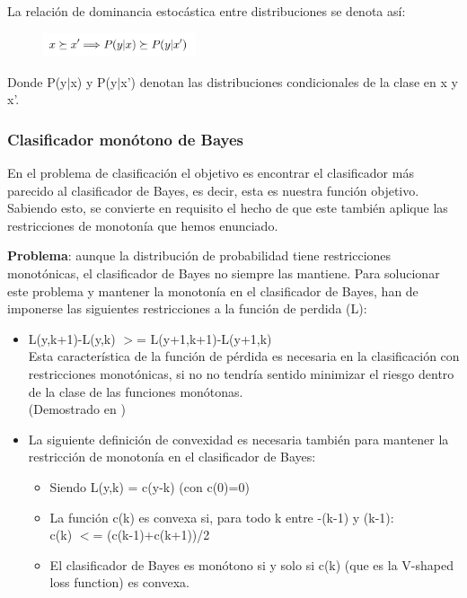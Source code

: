 La relación de dominancia estocástica entre distribuciones se denota así:

\begin{figure}[H]
	\centering
	\includegraphics[width=0.4\textwidth]{imagenes/f1}
\end{figure}

Donde P(y$|$x) y P(y$|$x') denotan las distribuciones condicionales de la clase en x y x'. 

\subsubsection{Clasificador monótono de Bayes}

En el problema de clasificación el objetivo es encontrar el clasificador más
parecido al clasificador de Bayes, es decir, esta es nuestra función objetivo.
Sabiendo esto, se convierte en requisito el hecho de que este también aplique
las restricciones de monotonía que hemos enunciado. 

\textbf{Problema}: aunque la
distribución de probabilidad tiene restricciones monotónicas, el clasificador
de Bayes no siempre las mantiene.
Para solucionar este problema y mantener la monotonía en el clasificador de 
Bayes, han de imponerse las siguientes restricciones a la función de perdida
(L):

\begin{itemize}
	\item L(y,k+1)-L(y,k) $>$= L(y+1,k+1)-L(y+1,k) \\
	Esta característica de la función de pérdida es necesaria
	en la clasificación con restricciones monotónicas, si no no
	tendría sentido minimizar el riesgo dentro de la clase de las funciones monótonas.\\
	(Demostrado en \cite{ref2})
	\item La siguiente definición de convexidad es necesaria también para
	mantener la restricción de monotonía en el clasificador de Bayes:
		\begin{itemize}
			\item Siendo L(y,k) = c(y-k) (con c(0)=0)
			\item La función c(k) es convexa si, para todo k entre -(k-1) y (k-1):\\
			c(k) $<$= (c(k-1)+c(k+1))/2
			\item El clasificador de Bayes es monótono si y solo si c(k) (que es
			la V-shaped loss function) es convexa.
		\end{itemize}
\end{itemize}


